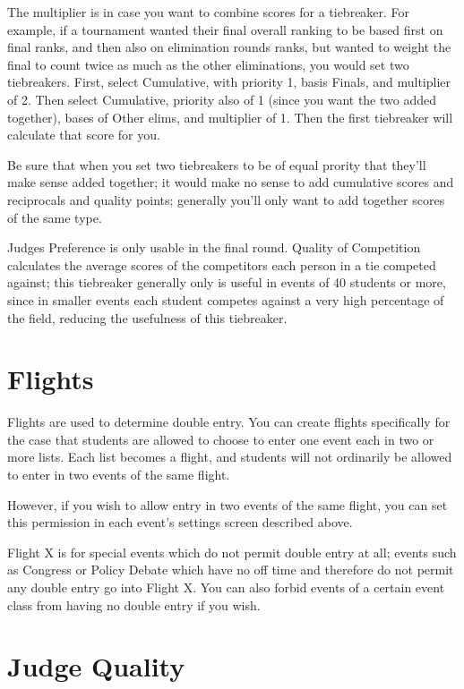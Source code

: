 \documentclass[12pt]{report} \usepackage {fullpage} \usepackage{times}
\begin{document}
The multiplier is in case you want to combine scores for a tiebreaker.  For
example, if a tournament wanted their final overall ranking to be based
first on final ranks, and then also on elimination rounds ranks, but wanted
to weight the final to count twice as much as the other eliminations, you
would set two tiebreakers.   First, select Cumulative, with priority 1,
basis Finals, and multiplier of 2.    Then select Cumulative, priority also
of 1 (since you want the two added together), bases of Other elims, and
multiplier of 1.  Then the first tiebreaker will calculate that score for
you.

Be sure that when you set two tiebreakers to be of equal prority that
they'll make sense added together; it would make no sense to add cumulative
scores and reciprocals and quality points; generally you'll only want to
add together scores of the same type.

Judges Preference is only usable in the final round.    Quality of
Competition calculates the average scores of the competitors each person in
a tie competed against; this tiebreaker generally only is useful in events
of 40 students or more, since in smaller events each student competes
against a very high percentage of the field, reducing the usefulness of
this tiebreaker.

 	
\section{Flights}

Flights are used to determine double entry.     You can create flights
specifically for the case that students are allowed to choose to enter one
event each in two or more lists.   Each list becomes a flight, and students
will not ordinarily be allowed to enter in two events of the same flight.

However, if you wish to allow entry in two events of the same flight, you
can set this permission in each event's settings screen described above.

Flight X is for special events which do not permit double entry at all;
events such as Congress or Policy Debate which have no off time and
therefore do not permit any double entry go into Flight X.  You can also
forbid events of a certain event class from having no double entry if you
wish. 

 	
\section{Judge Quality}
\end{document}
